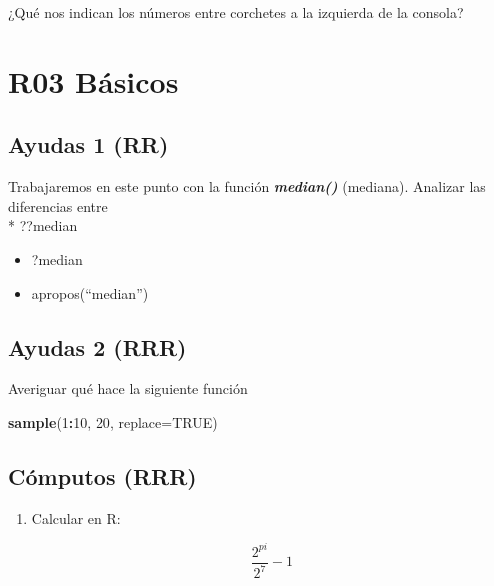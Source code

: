 \documentclass[]{book}
\newenvironment{Shaded}{\begin{snugshade}}{\end{snugshade}}
\newcommand{\DataTypeTok}[1]{\textcolor[rgb]{0.13,0.29,0.53}{#1}}
\newcommand{\DecValTok}[1]{\textcolor[rgb]{0.00,0.00,0.81}{#1}}
\newcommand{\KeywordTok}[1]{\textcolor[rgb]{0.13,0.29,0.53}{\textbf{#1}}}
\newcommand{\NormalTok}[1]{#1}
\newcommand{\OperatorTok}[1]{\textcolor[rgb]{0.81,0.36,0.00}{\textbf{#1}}}
\newcommand{\OtherTok}[1]{\textcolor[rgb]{0.56,0.35,0.01}{#1}}
\providecommand{\tightlist}{%
  \setlength{\itemsep}{0pt}\setlength{\parskip}{0pt}}
\begin{document}
¿Qué nos indican los números entre corchetes a la izquierda de la consola?

\hypertarget{r03-buxe1sicos}{%
\chapter*{R03 Básicos}\label{r03-buxe1sicos}}

\hypertarget{ayudas-1-rr}{%
\section{Ayudas 1 (RR)}\label{ayudas-1-rr}}

Trabajaremos en este punto con la función \emph{\textbf{median()}} (mediana). Analizar las diferencias entre\\
* ??median

\begin{itemize}
\tightlist
\item
  ?median
\end{itemize}

\begin{itemize}
\tightlist
\item
  apropos(``median'')
\end{itemize}

\hypertarget{ayudas-2-rrr}{%
\section{Ayudas 2 (RRR)}\label{ayudas-2-rrr}}

Averiguar qué hace la siguiente función

\begin{Shaded}
\begin{Highlighting}[]
\KeywordTok{sample}\NormalTok{(}\DecValTok{1}\OperatorTok{:}\DecValTok{10}\NormalTok{, }\DecValTok{20}\NormalTok{, }\DataTypeTok{replace=}\OtherTok{TRUE}\NormalTok{)}
\end{Highlighting}
\end{Shaded}

\hypertarget{cuxf3mputos-rrr}{%
\section{Cómputos (RRR)}\label{cuxf3mputos-rrr}}

\begin{enumerate}
\def\labelenumi{\arabic{enumi}.}
\item
  Calcular en R:

  \[\frac{2^{pi}}{2^{7}}-1\]
\end{enumerate}
\end{document}
